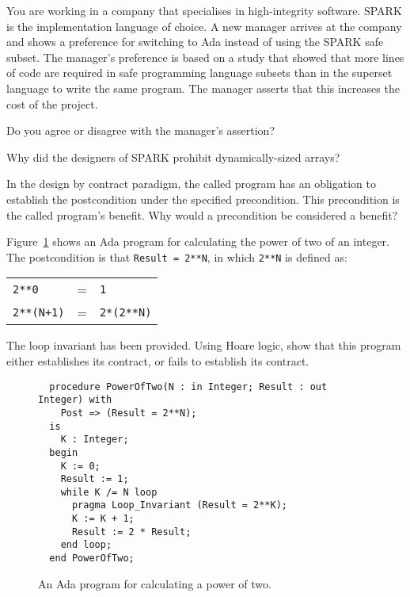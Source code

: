 

You are working in a company that specialises in high-integrity software. SPARK is the implementation language of choice. A new manager arrives at the company and shows a preference for switching to Ada instead of using the SPARK safe subset. The manager's preference is based on a study that showed that more lines of code are required in safe programming language subsets than in the superset language to write the same program. The manager asserts that this increases the cost of the project.

Do you agree or disagree with the manager's assertion?



Why did the designers of SPARK prohibit dynamically-sized arrays?



In the design by contract paradigm, the called program has an obligation to establish the postcondition under the specified precondition. This precondition is the called program's benefit. Why would a precondition be considered a benefit?


Figure~\ref{fig:poweroftwo} shows an Ada program for calculating the power of two of an integer. The postcondition is that \verb+Result = 2**N+, in which \verb+2**N+ is defined as:

\begin{tabular}{lll}
 \verb+2**0+ & = & \verb+1+\\
 \verb|2**(N+1)| & = & \verb|2*(2**N)|\\
\end{tabular}

The loop invariant has been provided. 
Using Hoare logic, show that this program either establishes its contract, or fails to establish its contract. 

\begin{figure}[!t]
\begin{verbatim}
  procedure PowerOfTwo(N : in Integer; Result : out Integer) with
    Post => (Result = 2**N);
  is
    K : Integer;
  begin
    K := 0;
    Result := 1;
    while K /= N loop
      pragma Loop_Invariant (Result = 2**K);
      K := K + 1;
      Result := 2 * Result;
    end loop;
  end PowerOfTwo;
\end{verbatim}
\caption{An Ada program for calculating a power of two.}
\label{fig:poweroftwo}
\end{figure}

